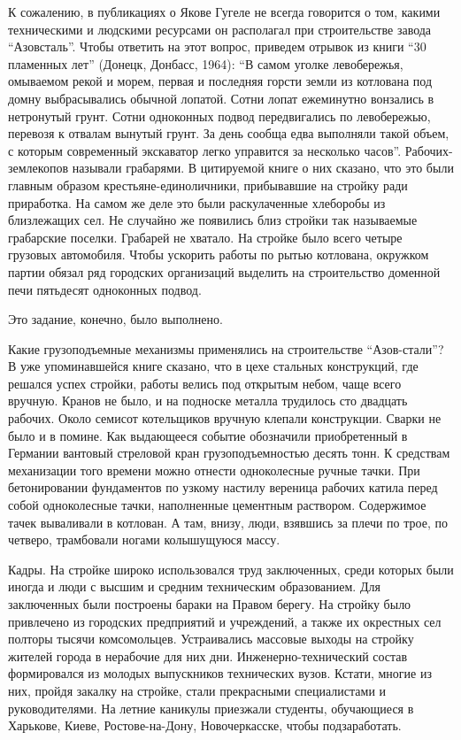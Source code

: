
К сожалению, в публикациях о Якове Гугеле не всегда говорится о том, какими
техническими и людскими ресурсами он располагал при строительстве завода
\enquote{Азовсталь}. Чтобы ответить на этот вопрос, приведем отрывок из книги \enquote{30
пламенных лет} (Донецк, Донбасс, 1964): \enquote{В самом уголке левобережья, омываемом
рекой и морем, первая и последняя горсти земли из котлована под домну
выбрасывались обычной лопатой. Сотни лопат ежеминутно вонзались в нетронутый
грунт. Сотни одноконных подвод передвигались по левобережью, перевозя к отвалам
вынутый грунт. За день сообща едва выполняли такой объем, с которым современный
экскаватор легко управится за несколько часов}. Рабочих-землекопов называли
грабарями. В цитируемой книге о них сказано, что это были главным образом
крестьяне-единоличники, прибывавшие на стройку ради приработка. На самом же
деле это были раскулаченные хлеборобы из близлежащих сел. Не случайно же
появились близ стройки так называемые грабарские поселки. Грабарей не хватало.
На стройке было всего четыре грузовых автомобиля. Чтобы ускорить работы по
рытью котлована, окружком партии обязал ряд городских организаций  выделить на
строительство доменной печи пятьдесят одноконных подвод.

Это задание, конечно, было выполнено.

Какие грузоподъемные механизмы применялись на строительстве \enquote{Азов\hyp{}стали}?  В уже
упоминавшейся книге сказано, что в цехе стальных конструкций, где решался успех
стройки, работы велись под открытым небом, чаще всего вручную.  Кранов не было,
и на подноске металла трудилось сто двадцать рабочих. Около семисот котельщиков
вручную  клепали конструкции. Сварки не было и в помине. Как выдающееся событие
обозначили приобретенный в Германии вантовый стреловой кран грузоподъемностью
десять тонн. К средствам механизации того времени можно отнести одноколесные
ручные тачки. При бетонировании фундаментов по узкому настилу вереница рабочих
катила перед собой одноколесные тачки, наполненные цементным раствором.
Содержимое тачек вываливали в котлован. А там, внизу, люди, взявшись за плечи
по трое, по четверо, трамбовали ногами колышущуюся массу.

Кадры. На стройке широко использовался труд заключенных, среди которых были
иногда и люди с высшим и средним техническим образованием. Для заключенных были
построены бараки на Правом берегу. На стройку было привлечено из городских
предприятий и учреждений, а также их окрестных сел полторы тысячи комсомольцев.
Устраивались массовые выходы на стройку жителей города в нерабочие для них дни.
Инженерно-технический состав формировался из молодых выпускников технических
вузов. Кстати, многие из них, пройдя закалку на стройке, стали прекрасными
специалистами и руководителями. На летние каникулы приезжали  студенты,
обучающиеся в Харькове, Киеве, Ростове-на-Дону, Новочеркасске, чтобы
подзаработать.

